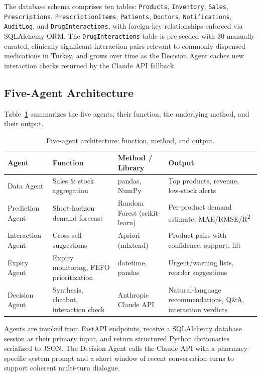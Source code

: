 \documentclass[12pt,a4paper]{article}
\begin{document}
The database schema comprises ten tables: \texttt{Products}, \texttt{Inventory}, \texttt{Sales}, \texttt{Prescriptions}, \texttt{PrescriptionItems}, \texttt{Patients}, \texttt{Doctors}, \texttt{Notifications}, \texttt{AuditLog}, and \texttt{DrugInteractions}, with foreign-key relationships enforced via SQLAlchemy ORM. The \texttt{DrugInteractions} table is pre-seeded with 30 manually curated, clinically significant interaction pairs relevant to commonly dispensed medications in Turkey, and grows over time as the Decision Agent caches new interaction checks returned by the Claude API fallback.

\subsection{Five-Agent Architecture}

Table~\ref{tab:agents} summarizes the five agents, their function, the underlying method, and their output.

\begin{table}[H]
\centering
\caption{Five-agent architecture: function, method, and output.}
\label{tab:agents}
\renewcommand{\arraystretch}{1.3}
\begin{tabularx}{\textwidth}{lXXX}
\toprule
\textbf{Agent} & \textbf{Function} & \textbf{Method / Library} & \textbf{Output} \\
\midrule
Data Agent & Sales \& stock aggregation & pandas, NumPy & Top products, revenue, low-stock alerts \\
Prediction Agent & Short-horizon demand forecast & Random Forest (scikit-learn) & Per-product demand estimate, MAE/RMSE/R\textsuperscript{2} \\
Interaction Agent & Cross-sell suggestions & Apriori (mlxtend) & Product pairs with confidence, support, lift \\
Expiry Agent & Expiry monitoring, FEFO prioritization & datetime, pandas & Urgent/warning lists, reorder suggestions \\
Decision Agent & Synthesis, chatbot, interaction check & Anthropic Claude API & Natural-language recommendations, Q\&A, interaction verdicts \\
\bottomrule
\end{tabularx}
\end{table}

Agents are invoked from FastAPI endpoints, receive a SQLAlchemy database session as their primary input, and return structured Python dictionaries serialized to JSON. The Decision Agent calls the Claude API with a pharmacy-specific system prompt and a short window of recent conversation turns to support coherent multi-turn dialogue.
\end{document}
